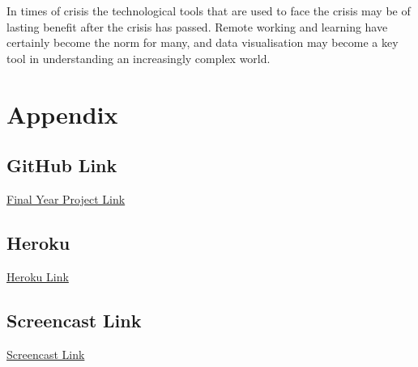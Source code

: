 In times of crisis the technological tools that are used to face the crisis may be of lasting benefit after the crisis has passed. Remote working and learning have certainly become the norm for many, and data visualisation may become a key tool in understanding an increasingly complex world.






\appendix 
\chapter{Appendix}
\section{GitHub Link}
\href{https://github.com/4th-year-project-2020-2021/Final-Year-Project-Data-Visualization}{Final Year Project Link}
\section{Heroku}
\href{https://final-year-project-data-visual.herokuapp.com/}{Heroku Link}
\section{Screencast Link}
\href{https://web.microsoftstream.com/video/d8ab7e52-3528-47bb-8ffe-b484f0ca3987?list=studio}{Screencast Link}

